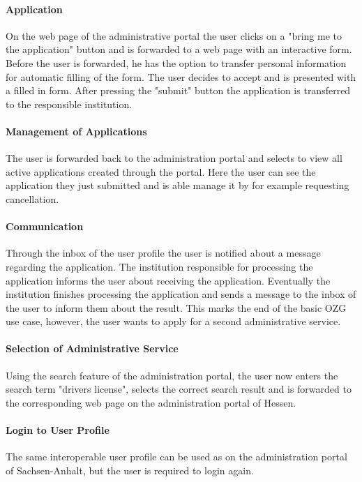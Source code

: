 \paragraph{Application} On the web page of the administrative portal the user clicks on a "bring me to the application" button and is forwarded to a web page with an interactive form. Before the user is forwarded, he has the option to transfer personal information for automatic filling of the form. The user decides to accept and is presented with a filled in form. After pressing the "submit" button the application is transferred to the responsible institution.
    
\paragraph{Management of Applications} The user is forwarded back to the administration portal and selects to view all active applications created through the portal. Here the user can see the application they just submitted and is able manage it by for example requesting cancellation.
    
\paragraph{Communication} Through the inbox of the user profile the user is notified about a message regarding the application. The institution responsible for processing the application informs the user about receiving the application. Eventually the institution finishes processing the application and sends a message to the inbox of the user to inform them about the result. This marks the end of the basic OZG use case, however, the user wants to apply for a second administrative service.

\paragraph{Selection of Administrative Service} Using the search feature of the administration portal, the user now enters the search term "drivers license", selects the correct search result and is forwarded to the corresponding web page on the administration portal of Hessen. 

\paragraph{Login to User Profile} The same interoperable user profile can be used as on the administration portal of Sachsen-Anhalt, but the user is required to login again.

